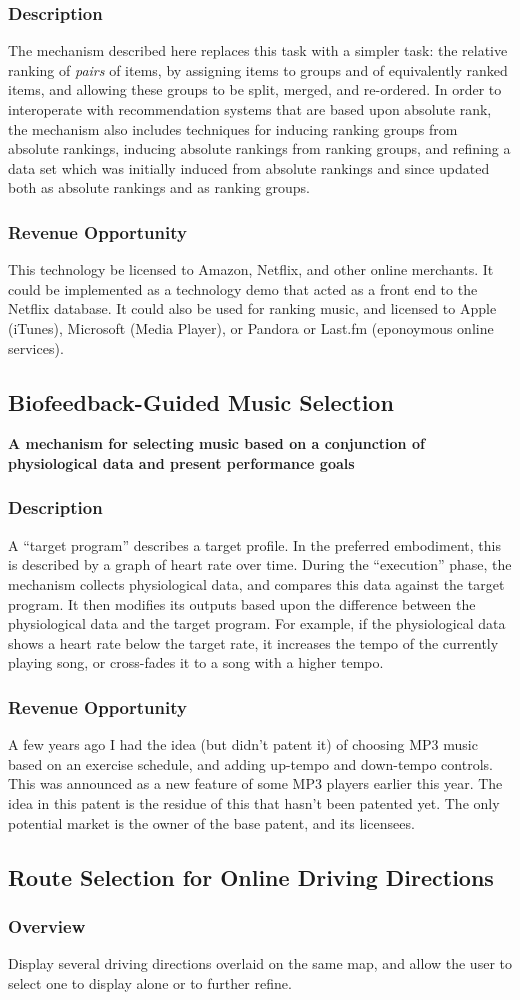 \documentclass{article}
\newcommand{\ptitle}[1]{\textbf{#1}}
\newcommand{\poverview}{\subsubsection{Overview}}
\newcommand{\pdescription}{\subsubsection{Description}}
\newcommand{\prevenue}{\subsubsection{Revenue Opportunity}}
\begin{document}
\pdescription
The mechanism described here replaces this task with a simpler task: the relative ranking of \emph{pairs} of items, by assigning items to groups and of equivalently ranked items, and allowing these groups to be split, merged, and re-ordered.  In order to interoperate with recommendation systems that are based upon absolute rank, the mechanism also includes techniques for inducing ranking groups from absolute rankings, inducing absolute rankings from ranking groups, and refining a data set which was initially induced from absolute rankings and since updated both as absolute rankings and as ranking groups.

\prevenue
This technology be licensed to Amazon, Netflix, and other online merchants.  It could be implemented as a technology demo that acted as a front end to the Netflix database.  It could also be used for ranking music, and licensed to Apple (iTunes), Microsoft (Media Player), or Pandora or Last.fm (eponoymous online services).


\subsection{Biofeedback-Guided Music Selection}

\ptitle{A mechanism for selecting music based on a conjunction of physiological data and present performance goals}

\pdescription
A ``target program'' describes a target profile.  In the preferred embodiment, this is described by a graph of heart rate over time.  During the ``execution'' phase, the mechanism collects physiological data, and compares this data against the target program.  It then modifies its outputs based upon the difference between the physiological data and the target program.  For example, if the physiological data shows a heart rate below the target rate, it increases the tempo of the currently playing song, or cross-fades it to a song with a higher tempo.

\prevenue
A few years ago I had the idea (but didn't patent it) of choosing MP3 music based on an exercise schedule, and adding up-tempo and down-tempo controls.  This was announced as a new feature of some MP3 players earlier this year.  The idea in this patent is the residue of this that hasn't been patented yet.  The only potential market is the owner of the base patent, and its licensees.


\subsection{Route Selection for Online Driving Directions}
\poverview
Display several driving directions overlaid on the same map, and allow the user to select one to display alone or to further refine.
\end{document}
